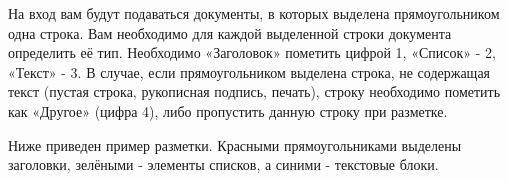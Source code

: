 \documentclass[a4paper,12pt]{article}
\begin{document}
На вход вам будут подаваться документы, в которых выделена прямоугольником одна строка. Вам необходимо для каждой выделенной строки документа определить её тип. Необходимо «Заголовок» пометить цифрой 1, «Список» - 2, «Текст» - 3. В случае, если прямоугольником выделена строка, не содержащая текст (пустая строка, рукописная подпись, печать), строку необходимо пометить как «Другое» (цифра 4), либо пропустить данную строку при разметке.

Ниже приведен пример разметки. Красными прямоугольниками выделены заголовки, зелёными - элементы списков, а синими - текстовые блоки.

\begin{center}
\end{center}
\end{document}

